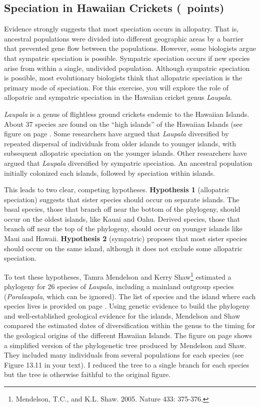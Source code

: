 \documentclass[11pt, addpoints]{exam}
\begin{document}
\subsection*{Speciation in Hawaiian Crickets (\numpoints\ points)}

Evidence strongly suggests that most speciation occurs in allopatry.
That is, ancestral populations were divided into different geographic
areas by a barrier that prevented gene flow between the populations.
However, some biologists argue that sympatric speciation is possible.
Sympatric speciation occurs if new species arise from within a single,
undivided population. Although sympatric speciation is possible, most
evolutionary biologists think that allopatric speciation is the primary
mode of speciation. For this exercise, you will explore the role of
allopatric and sympatric speciation in the Hawaiian cricket genus
\emph{Laupala}.

\emph{Laupala} is a genus of flightless ground crickets endemic to the
Hawaiian Islands. About 37 species are found on the ``high islands'' of
the Hawaiian Islands (see figure on page \pageref{fig:cricket_phylogeny}. Some researchers have
argued that \emph{Laupala} diversified by repeated dispersal of
individuals from older islands to younger islands, with subsequent
allopatric speciation on the younger islands. Other researchers have
argued that \emph{Laupala} diversified by sympatric speciation. An
ancestral population initially colonized each islands, followed by speciation
within islands.

This leads to two clear, competing hypotheses. \textbf{Hypothesis 1}
(allopatric speciation) suggests that sister species should occur on
separate islands. The basal species, those that branch off near the
bottom of the phylogeny, should occur on the oldest islands, like Kauai
and Oahu. Derived species, those that branch off near the top of the
phylogeny, should occur on younger islands like Maui and Hawaii.
\textbf{Hypothesis 2} (sympatric) proposes that most sister species
should occur on the same island, although it does not exclude some
allopatric speciation.

To test these hypotheses, Tamra Mendelson and Kerry Shaw\footnote{Mendelson,
  T.C., and K.L. Shaw. 2005. Nature 433: 375-376.} estimated a phylogeny
for 26 species of \emph{Laupala}, including a mainland outgroup species
(\emph{Paralaupala}, which can be ignored). The list of species and the
island where each species lives is provided on page \pageref{tab:cricket_table}. Using
genetic evidence to build the phylogeny and well-established geological
evidence for the islands, Mendelson and Shaw compared the estimated
dates of diversification within the genus to the timing for the
geological origins of the different Hawaiian Islands. The figure on page \pageref{fig:cricket_phylogeny}
 shows a simplified version of the phylogenetic tree produced by Mendelson
and Shaw. They included many individuals from several populations for
each species (see Figure 13.11 in your text). I reduced the tree to a
single branch for each species but the tree is otherwise faithful to the
original figure.\vspace{\baselineskip}
\end{document}

